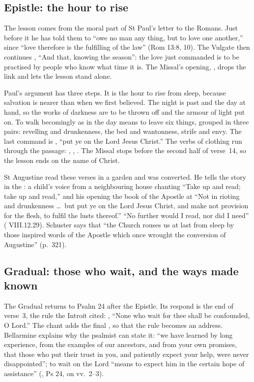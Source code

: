 \subsection{Epistle: the hour to rise}
\label{sec:element-epistle}

The lesson comes from the moral part of St Paul's letter to the Romans. Just
before it he has told them to ``owe no man any thing, but to love one
another,'' since ``love therefore is the fulfilling of the law'' (Rom
13:8, 10). The Vulgate then continues , ``And
that, knowing the season'': the love just commanded is to be practised by
people who know what time it is. The Missal's opening, , drops the link and lets the lesson stand alone.

Paul's argument has three steps. It is the hour to rise from sleep, because
salvation is nearer than when we first believed. The night is past and the
day at hand, so the works of darkness are to be thrown off and the armour of
light put on. To walk becomingly as in the day means to leave six things,
grouped in three pairs: revelling and drunkenness, the bed and wantonness,
strife and envy. The last command is , ``put ye on the Lord Jesus Christ.''
The verbs of clothing run through the passage: ,
, . The Missal stops before the second half
of verse~14, so the lesson ends on the name of Christ.

St Augustine read these verses in a garden and was converted. He
tells the story in the : a child's voice from a neighbouring
house chanting ``Take up and read; take up and read,'' and his opening the
book of the Apostle at ``Not in rioting and drunkenness \dots\ but put ye on
the Lord Jesus Christ, and make not provision for the flesh, to fulfil the
lusts thereof.'' ``No further would I read, nor did I need''
( VIII.12.29). Schuster says that ``the Church rouses us at
last from sleep by those inspired words of the Apostle which once wrought
the conversion of Augustine'' (p.~321).

\subsection{Gradual: those who wait, and the ways made known}
\label{sec:element-gradual}

The Gradual returns to Psalm 24 after the Epistle. Its respond is the end of
verse~3, the rule the Introit cited: , ``None who wait for thee shall be confounded, O
Lord.'' The chant adds the final , so that the rule becomes an
address. Bellarmine explains why the psalmist can state it: ``we have learned
by long experience, from the examples of our ancestors, and from your own
promises, that those who put their trust in you, and patiently expect your
help, were never disappointed''; to wait on the Lord ``means to expect him in
the certain hope of assistance'' (, Ps 24, on vv.~2--3).

